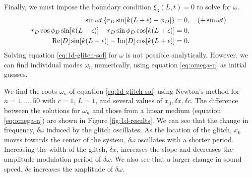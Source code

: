 Finally, we must impose the boundary condition \(\xi_3(L, t) = 0\) to solve for \(\omega\).
%
\begin{align}
    \sin \omega t \left\{r_D \sin[k(L + \epsilon) - \phi_D]\right\} &= 0, \quad (\div \sin \omega t)\\
    r_D \cos \phi_D \sin[k(L + \epsilon)] - r_D \sin \phi_D \cos[k(L + \epsilon)] &= 0,\\
    {\mathrm{Re}}[D] \sin[k(L + \epsilon)] - {\mathrm{Im}}[D] \cos[k(L + \epsilon)] &=0. \label{eq:1d-glitch-sol}
\end{align}
%
Solving equation \ref{eq:1d-glitch-sol} for \(\omega\) is not possible analytically. However, we can find individual modes \(\omega_n\) numerically, using equation \ref{eq:omega-n} as initial guesses.

We find the roots \(\omega_n\) of equation \ref{eq:1d-glitch-sol} using Newton's method for \(n = 1,\dots,50\) with \(c=1\), \(L=1\), and several values of \(x_0, \delta x, \delta c\). The difference between the solutions for \(\omega_n\) and those from a linear medium (equation \ref{eq:omega-n}) are shown in Figure \ref{fig:1d-results}. We can see that the change in frequency, \(\delta \omega\) induced by the glitch oscillates. As the location of the glitch, \(x_0\) moves towards the center of the system, \(\delta\omega\) oscillates with a shorter period. Increasing the width of the glitch, \(\delta x\), increases the slope and decreases the amplitude modulation period of \(\delta\omega\). We also see that a larger change in sound speed, \(\delta c\) increases the amplitude of \(\delta\omega\).

